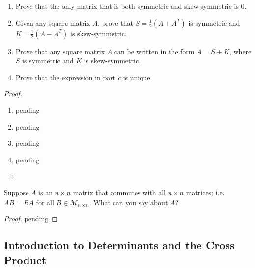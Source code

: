 \begin{exercise} \label{e1.4.36}
    \begin{enumerate}
        \item Prove that the only matrix that is both symmetric and skew-symmetric is \( 0 \).
        
        \item Given any square matrix \( A \), prove that \( S = \frac{1}{2}(A+A^T) \) is symmetric and \( K = \frac{1}{2}(A-A^T) \) is skew-symmetric.
        
        \item Prove that any square matrix \( A \) can be written in the form \( A = S + K \), where \( S \) is symmetric and \( K \) is skew-symmetric.
        
        \item Prove that the expression in part \( c \) is unique.
    \end{enumerate}
    
    \begin{proof}
        \begin{enumerate}
            \item pending
            
            \item pending
            
            \item pending
            
            \item pending
        \end{enumerate}
    \end{proof}
\end{exercise} %

\begin{exercise} \label{e1.4.37}
    Suppose \( A \) is an \( n \times n \) matrix that commutes with all \( n \times n \) matrices; i.e. \( AB = BA \) for all \( B \in \mathcal{M}_{n \times n} \). What can you say about \( A \)?
    
    \begin{proof}
        pending
    \end{proof}
\end{exercise} %

\subsection{Introduction to Determinants and the Cross Product}